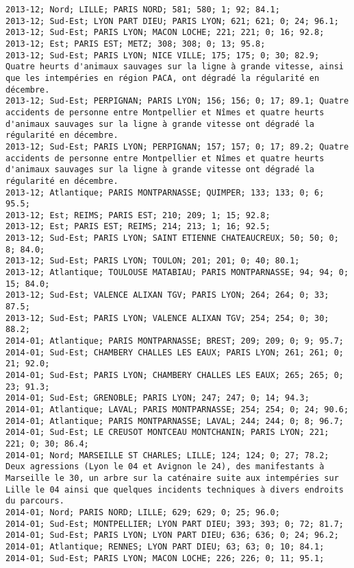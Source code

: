 \documentclass{article}
\begin{document}
\begin{Verbatim}[commandchars=\\\{\}]
2013-12; Nord; LILLE; PARIS NORD; 581; 580; 1; 92; 84.1; 
2013-12; Sud-Est; LYON PART DIEU; PARIS LYON; 621; 621; 0; 24; 96.1; 
2013-12; Sud-Est; PARIS LYON; MACON LOCHE; 221; 221; 0; 16; 92.8; 
2013-12; Est; PARIS EST; METZ; 308; 308; 0; 13; 95.8; 
2013-12; Sud-Est; PARIS LYON; NICE VILLE; 175; 175; 0; 30; 82.9; Quatre heurts d'animaux sauvages sur la ligne à grande vitesse, ainsi que les intempéries en région PACA, ont dégradé la régularité en décembre.
2013-12; Sud-Est; PERPIGNAN; PARIS LYON; 156; 156; 0; 17; 89.1; Quatre accidents de personne entre Montpellier et Nîmes et quatre heurts d'animaux sauvages sur la ligne à grande vitesse ont dégradé la régularité en décembre.
2013-12; Sud-Est; PARIS LYON; PERPIGNAN; 157; 157; 0; 17; 89.2; Quatre accidents de personne entre Montpellier et Nîmes et quatre heurts d'animaux sauvages sur la ligne à grande vitesse ont dégradé la régularité en décembre.
2013-12; Atlantique; PARIS MONTPARNASSE; QUIMPER; 133; 133; 0; 6; 95.5; 
2013-12; Est; REIMS; PARIS EST; 210; 209; 1; 15; 92.8; 
2013-12; Est; PARIS EST; REIMS; 214; 213; 1; 16; 92.5; 
2013-12; Sud-Est; PARIS LYON; SAINT ETIENNE CHATEAUCREUX; 50; 50; 0; 8; 84.0; 
2013-12; Sud-Est; PARIS LYON; TOULON; 201; 201; 0; 40; 80.1; 
2013-12; Atlantique; TOULOUSE MATABIAU; PARIS MONTPARNASSE; 94; 94; 0; 15; 84.0; 
2013-12; Sud-Est; VALENCE ALIXAN TGV; PARIS LYON; 264; 264; 0; 33; 87.5; 
2013-12; Sud-Est; PARIS LYON; VALENCE ALIXAN TGV; 254; 254; 0; 30; 88.2; 
2014-01; Atlantique; PARIS MONTPARNASSE; BREST; 209; 209; 0; 9; 95.7; 
2014-01; Sud-Est; CHAMBERY CHALLES LES EAUX; PARIS LYON; 261; 261; 0; 21; 92.0; 
2014-01; Sud-Est; PARIS LYON; CHAMBERY CHALLES LES EAUX; 265; 265; 0; 23; 91.3; 
2014-01; Sud-Est; GRENOBLE; PARIS LYON; 247; 247; 0; 14; 94.3; 
2014-01; Atlantique; LAVAL; PARIS MONTPARNASSE; 254; 254; 0; 24; 90.6; 
2014-01; Atlantique; PARIS MONTPARNASSE; LAVAL; 244; 244; 0; 8; 96.7; 
2014-01; Sud-Est; LE CREUSOT MONTCEAU MONTCHANIN; PARIS LYON; 221; 221; 0; 30; 86.4; 
2014-01; Nord; MARSEILLE ST CHARLES; LILLE; 124; 124; 0; 27; 78.2; Deux agressions (Lyon le 04 et Avignon le 24), des manifestants à Marseille le 30, un arbre sur la caténaire suite aux intempéries sur Lille le 04 ainsi que quelques incidents techniques à divers endroits du parcours.
2014-01; Nord; PARIS NORD; LILLE; 629; 629; 0; 25; 96.0; 
2014-01; Sud-Est; MONTPELLIER; LYON PART DIEU; 393; 393; 0; 72; 81.7; 
2014-01; Sud-Est; PARIS LYON; LYON PART DIEU; 636; 636; 0; 24; 96.2; 
2014-01; Atlantique; RENNES; LYON PART DIEU; 63; 63; 0; 10; 84.1; 
2014-01; Sud-Est; PARIS LYON; MACON LOCHE; 226; 226; 0; 11; 95.1; 

\end{Verbatim}
\end{document}
